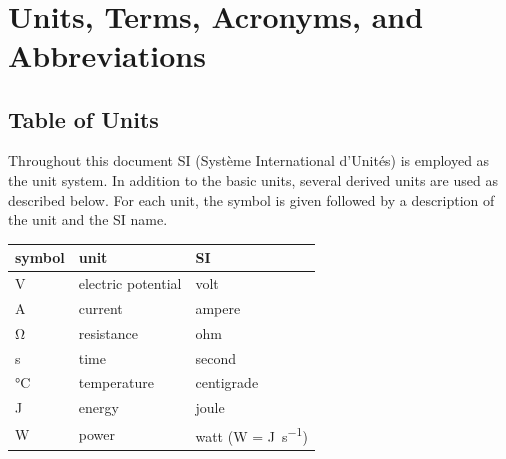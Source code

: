 \documentclass[12pt]{article}
\begin{document}
~\newpage

\section{Units, Terms, Acronyms, and Abbreviations}

\subsection{Table of Units}
Throughout this document SI (Syst\`{e}me International d'Unit\'{e}s) is employed
as the unit system.  In addition to the basic units, several derived units are
used as described below.  For each unit, the symbol is given followed by a
description of the unit and the SI name.

\begin{table}[ht]
  \noindent \begin{tabular}{l l l} 
    \toprule		
    \textbf{symbol} & \textbf{unit} & \textbf{SI}\\
    \midrule 
    \si{\volt} & electric potential & volt\\
    \si{\ampere} & current	& ampere\\
    \si{\ohm} & resistance	& ohm\\
    \si{\second} & time & second\\
    \si{\celsius} & temperature & centigrade\\
    \si{\joule} & energy & joule\\
    \si{\watt} & power & watt (W = \si{\joule\per\second})\\
    \bottomrule
  \end{tabular}
\end{table}

\newpage
\end{document}
